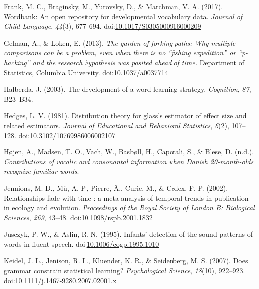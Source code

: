 \documentclass[man]{apa6}
\begin{document}
\leavevmode\hypertarget{ref-Frank2017}{}%
Frank, M. C., Braginsky, M., Yurovsky, D., \& Marchman, V. A. (2017). Wordbank: An open repository for developmental vocabulary data. \emph{Journal of Child Language}, \emph{44}(3), 677--694. doi:\href{https://doi.org/10.1017/S0305000916000209}{10.1017/S0305000916000209}

\leavevmode\hypertarget{ref-Gelman2013}{}%
Gelman, A., \& Loken, E. (2013). \emph{The garden of forking paths: Why multiple comparisons can be a problem, even when there is no ``fishing expedition'' or ``p-hacking'' and the research hypothesis was posited ahead of time.} Department of Statistics, Columbia University. doi:\href{https://doi.org/10.1037/a0037714}{10.1037/a0037714}

\leavevmode\hypertarget{ref-Halberda2003}{}%
Halberda, J. (2003). The development of a word-learning strategy. \emph{Cognition}, \emph{87}, B23--B34.

\leavevmode\hypertarget{ref-Hedges1981}{}%
Hedges, L. V. (1981). Distribution theory for glass's estimator of effect size and related estimators. \emph{Journal of Educational and Behavioral Statistics}, \emph{6}(2), 107--128. doi:\href{https://doi.org/10.3102/10769986006002107}{10.3102/10769986006002107}

\leavevmode\hypertarget{ref-Hojen}{}%
Højen, A., Madsen, T. O., Vach, W., Basbøll, H., Caporali, S., \& Blese, D. (n.d.). \emph{Contributions of vocalic and consonantal information when Danish 20-month-olds recognize familiar words}.

\leavevmode\hypertarget{ref-Jennions2002}{}%
Jennions, M. D., Mù, A. P., Pierre, Â., Curie, M., \& Cedex, F. P. (2002). Relationships fade with time : a meta-analysis of temporal trends in publication in ecology and evolution. \emph{Proceedings of the Royal Society of London B: Biological Sciences}, \emph{269}, 43--48. doi:\href{https://doi.org/10.1098/rspb.2001.1832}{10.1098/rspb.2001.1832}

\leavevmode\hypertarget{ref-Jusczyk1995}{}%
Jusczyk, P. W., \& Aslin, R. N. (1995). Infants' detection of the sound patterns of words in fluent speech. doi:\href{https://doi.org/10.1006/cogp.1995.1010}{10.1006/cogp.1995.1010}

\leavevmode\hypertarget{ref-Keidel2007}{}%
Keidel, J. L., Jenison, R. L., Kluender, K. R., \& Seidenberg, M. S. (2007). Does grammar constrain statistical learning? \emph{Psychological Science}, \emph{18}(10), 922--923. doi:\href{https://doi.org/10.1111/j.1467-9280.2007.02001.x}{10.1111/j.1467-9280.2007.02001.x}
\end{document}
